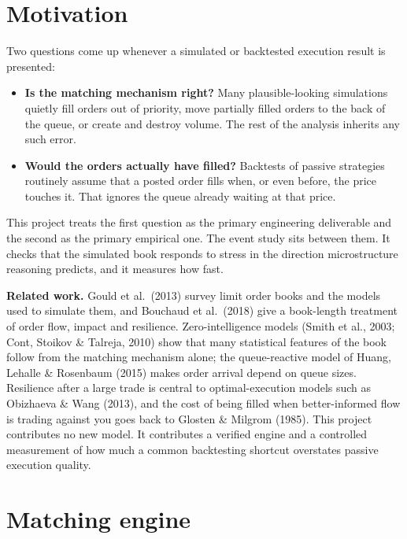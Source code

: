 \documentclass[11pt]{article}
\providecommand{\tightlist}{\setlength{\itemsep}{0pt}\setlength{\parskip}{0pt}}
\begin{document}
\hypertarget{motivation}{%
\section{Motivation}\label{motivation}}

Two questions come up whenever a simulated or backtested execution
result is presented:

\begin{itemize}
\tightlist
\item
  \textbf{Is the matching mechanism right?} Many plausible-looking
  simulations quietly fill orders out of priority, move partially filled
  orders to the back of the queue, or create and destroy volume. The
  rest of the analysis inherits any such error.
\item
  \textbf{Would the orders actually have filled?} Backtests of passive
  strategies routinely assume that a posted order fills when, or even
  before, the price touches it. That ignores the queue already waiting
  at that price.
\end{itemize}

This project treats the first question as the primary engineering
deliverable and the second as the primary empirical one. The event study
sits between them. It checks that the simulated book responds to stress
in the direction microstructure reasoning predicts, and it measures how
fast.

\textbf{Related work.} Gould et al.~(2013) survey limit order books and the
models used to simulate them, and Bouchaud et al.~(2018) give a
book-length treatment of order flow, impact and resilience.
Zero-intelligence models (Smith et al., 2003; Cont, Stoikov \& Talreja,
2010) show that many statistical features of the book follow from the
matching mechanism alone; the queue-reactive model of Huang, Lehalle \&
Rosenbaum (2015) makes order arrival depend on queue sizes. Resilience
after a large trade is central to optimal-execution models such as
Obizhaeva \& Wang (2013), and the cost of being filled when better-informed
flow is trading against you goes back to Glosten \& Milgrom (1985). This
project contributes no new model. It contributes a verified engine and a
controlled measurement of how much a common backtesting shortcut
overstates passive execution quality.

\hypertarget{matching-engine}{%
\section{Matching engine}\label{matching-engine}}
\end{document}
